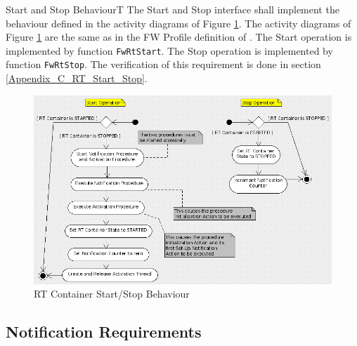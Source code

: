 \documentclass[a4paper,10pt]{article}
\newenvironment{fw_req}[6]
{\addtocounter{subsubsection}{1}
	\hspace{0.2cm}\textbf{FW-\arabic{section}.\arabic{subsection}.\arabic{subsubsection}/#2
	\hspace{0.8cm} #1}
	\vspace{-10pt}
\begin{longtable}{p{2.7cm}P{8.5cm}}
\hline
\textsc{Requirement} & #3 \\
\textsc{Justification} & #4 \\
\textsc{Implementation} & #5  \\ 
\textsc{Verification} & #6  \\
\hline
}
{\end{longtable}}
\begin{document}
\begin{fw_req}{Start and Stop Behaviour}{T}
{The Start and Stop interface shall implement the behaviour defined in the 
activity diagrams of Figure \ref{fig:RTStartStop}.}
{The activity diagrams of Figure \ref{fig:RTStartStop} are the same as in 
the FW Profile definition of \cite{ref:fwprofile}.}
{The Start operation is implemented by function \texttt{FwRtStart}. The Stop operation is implemented by function \texttt{FwRtStop}.} 
{The verification of this requirement is done in section \ref{Appendix_C_RT_Start_Stop}.}
\end{fw_req}

\begin{figure}[h]
 \centering
 \includegraphics[scale=0.42,keepaspectratio=true]{../images/RTStartStop.png}
 \caption{RT Container Start/Stop Behaviour}
 \label{fig:RTStartStop}
\end{figure}


\subsection{Notification Requirements}\label{req:notifInterface}
\end{document}
